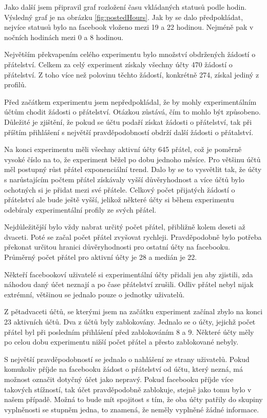 \documentclass[thesis=M,czech]{FITthesis}[2013/05/10]
\begin{document}
Jako další jsem připravil graf rozložení času vkládaných statusů podle hodin. Výsledný graf je na obrázku \ref{fig:postedHours}. Jak by se dalo předpokládat, nejvíce statusů bylo na facebook vloženo mezi 19 a 22 hodinou. Nejméně pak v nočních hodinách mezi 0 a 8 hodinou.



Největším překvapením celého experimentu bylo množství obdržených žádostí o přátelství. Celkem za celý experiment získaly všechny účty 470 žádostí o přátelství. Z toho více než polovinu těchto žádostí, konkrétně 274, získal jediný z profilů. 

Před začátkem experimentu jsem nepředpokládal, že by mohly experimentálním účtům chodit žádosti o přátelství. Otázkou zůstává, čím to mohlo být způsobeno. Důležité je zjištění, že pokud se účtu podaří získat žádosti o přátelství, tak při příštím přihlášení s největší pravděpodobností obdrží další žádosti o přátalství.

Na konci experimentu měli všechny aktivní účty 645 přátel, což je poměrně vysoké číslo na to, že experiment běžel po dobu jednoho měsíce. Pro většinu účtů měl postupný růst přátel exponenciální trend. Dalo by se to vysvětlit tak, že účty s narůstajícím počtem přátel získávaly vyšší důvěryhodnost a více účtů bylo ochotných si je přidat mezi své přátele. Celkový počet přijatých žádostí o přátelství ale bude ještě vyšší, jelikož některé účty si během experimentu odebíraly experimentální profily ze svých přátel. 

Nejdůležitější bylo vždy nabrat určitý počet přátel, přibližně kolem deseti až dvaceti. Poté se začal počet přátel zvyšovat rychleji. Pravděpodobně bylo potřeba překonat určitou hranici důvěryhodnosti pro ostatní účty na facebooku. Průměrný počet přátel pro aktivní účty je 28 a medián je 22. 

Někteří facebookoví uživatelé si experimentální účty přidali jen aby zjistili, zda náhodou daný účet neznají a po čase přátelství zrušili. Odliv přátel nebyl nijak extrémní, většinou se jednalo pouze o jednotky uživatelů. 

Z pětadvaceti účtů, se kterými jsem na začátku experiment začínal zbylo na konci 23 aktivních účtů. Dva z účtů byly zablokovány. Jednalo se o účty, jejichž počet přátel byl při posledním přihlášení před zablokováním 8 a 9. Některé účty měly po celou dobu experimentu nižší počet přátel a přesto zablokované nebyly.

S největší pravděpodobností se jednalo o nahlášení ze strany uživatelů. Pokud komukoliv příjde na facebooku žádost o přátelství od účtu, který nezná, má možnost označit dotyčný účet jako nepravý. Pokud facebooku příjde více takových stížností, tak účet pravděpodobně zablokuje, stejně jako tomu bylo v našem případě. Možná to bude mít spojitost s tím, že oba účty patřily do skupiny vyplněnosti se stupněm jedna, to znamená, že neměly vyplněné žádné informace.
\end{document}
